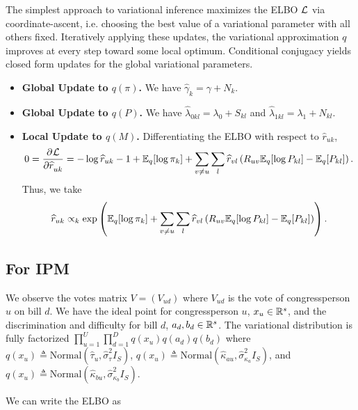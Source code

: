 \documentclass{article}
\begin{document}
 The simplest approach to variational inference maximizes the ELBO $\mathcal{L}$ via coordinate-ascent, i.e. choosing the best value of a variational parameter with all others fixed. Iteratively applying these updates, the variational approximation $q$ improves at every step toward some local optimum. Conditional conjugacy yields closed form updates for the global variational parameters. 

\begin{itemize}
\item {\bf Global Update to $q(\pi)$.} We have $\widehat \gamma_{k} = \gamma + N_k$.
\item {\bf Global Update to $q(P)$.} We have $\widehat \lambda_{0kl} = \lambda_0 + S_{kl}$ and $\widehat \lambda_{1kl} = \lambda_1 + N_{kl}$.
\item {\bf Local Update to $q(M)$.} Differentiating the ELBO with respect to $\widehat r_{uk}$,
$$
0 = \frac{\partial^{}\mathcal{L}}{\partial \widehat r_{uk}^{}}= -\log \widehat r_{uk} -1 + \mathbb{E}_q[\log \pi_k]
+ \sum_{v\neq u} \sum_l \widehat r_{vl}\left(R_{uv}\mathbb{E}_q[\log P_{kl}] - \mathbb{E}_q[P_{kl}]\right).
$$
Thus, we take 
$$
\widehat r_{uk} \propto_k \exp\left(\mathbb{E}_q[\log \pi_k]
+ \sum_{v\neq u} \sum_l \widehat r_{vl}\left(R_{uv}\mathbb{E}_q[\log P_{kl}] - \mathbb{E}_q[P_{kl}]\right)\right).
$$
\end{itemize}


\subsection{For IPM}
\label{ipmvi}


We observe the votes matrix $V = (V_{ud})$ where $V_{ud}$ is the vote of congressperson $u$ on bill $d$. We have the ideal point for congressperson $u$, $x_u \in \mathbb{R}^s$, and the discrimination and difficulty for bill $d$, $a_d,b_d \in \mathbb{R}^s$. The variational distribution is fully factorized $\prod_{u=1}^U \prod_{d=1}^D q(x_u)q(a_d)q(b_d)$ where $q(x_u) \triangleq \text{Normal}(\hat{\tau}_u, \hat{\sigma}^2_\tau I_S)$, $q(x_u) \triangleq \text{Normal}(\hat{\kappa}_{au}, \hat{\sigma}^2_{\kappa_a} I_S)$, and $q(x_u) \triangleq \text{Normal}(\hat{\kappa}_{bu}, \hat{\sigma}^2_{\kappa_b} I_S)$. \vspace{.5em}

We can write the ELBO as \vspace{-1em}
\end{document}
